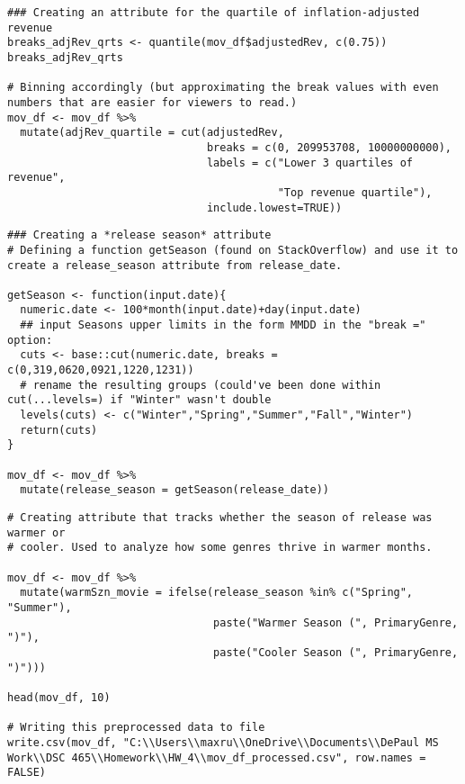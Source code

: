 \begin{lstlisting}
### Creating an attribute for the quartile of inflation-adjusted revenue
breaks_adjRev_qrts <- quantile(mov_df$adjustedRev, c(0.75))
breaks_adjRev_qrts

# Binning accordingly (but approximating the break values with even numbers that are easier for viewers to read.)
mov_df <- mov_df %>%
  mutate(adjRev_quartile = cut(adjustedRev,
                               breaks = c(0, 209953708, 10000000000),
                               labels = c("Lower 3 quartiles of revenue",
                                          "Top revenue quartile"),
                               include.lowest=TRUE))
\end{lstlisting}

\begin{lstlisting}
### Creating a *release season* attribute
# Defining a function getSeason (found on StackOverflow) and use it to create a release_season attribute from release_date.

getSeason <- function(input.date){
  numeric.date <- 100*month(input.date)+day(input.date)
  ## input Seasons upper limits in the form MMDD in the "break =" option:
  cuts <- base::cut(numeric.date, breaks = c(0,319,0620,0921,1220,1231)) 
  # rename the resulting groups (could've been done within cut(...levels=) if "Winter" wasn't double
  levels(cuts) <- c("Winter","Spring","Summer","Fall","Winter")
  return(cuts)
}

mov_df <- mov_df %>%
  mutate(release_season = getSeason(release_date))
\end{lstlisting}

\begin{lstlisting}
# Creating attribute that tracks whether the season of release was warmer or 
# cooler. Used to analyze how some genres thrive in warmer months.

mov_df <- mov_df %>%
  mutate(warmSzn_movie = ifelse(release_season %in% c("Spring", "Summer"), 
                                paste("Warmer Season (", PrimaryGenre, ")"), 
                                paste("Cooler Season (", PrimaryGenre, ")")))

head(mov_df, 10)

# Writing this preprocessed data to file
write.csv(mov_df, "C:\\Users\\maxru\\OneDrive\\Documents\\DePaul MS Work\\DSC 465\\Homework\\HW_4\\mov_df_processed.csv", row.names = FALSE)
\end{lstlisting}

